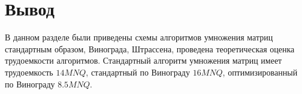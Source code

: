 \section*{Вывод}
В данном разделе были приведены схемы алгоритмов умножения матриц стандартным образом, Винограда, Штрассена, проведена теоретическая оценка трудоемкости алгоритмов. Стандартный алгоритм умножения матриц имеет трудоемкость $14MNQ$, стандартный по Винограду $16MNQ$, оптимизированный по Винограду $8.5MNQ$.
